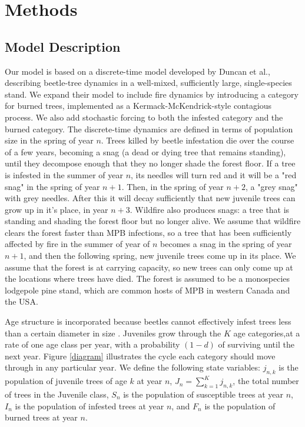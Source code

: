 \section{Methods}

\subsection{Model Description}

Our model is based on a discrete-time model developed by Duncan et al.\cite{duncan2015model}, describing beetle-tree dynamics in a well-mixed, sufficiently large, single-species stand. We expand their model to include fire dynamics by introducing a category for burned trees, implemented as a Kermack-McKendrick-style contagious process\cite{edelstein1988mathematical}. We also add stochastic forcing to both the infested category and the burned category. The discrete-time dynamics are defined in terms of population size in the spring of year $n$. Trees killed by beetle infestation die over the course of a few years, becoming a snag (a dead or dying tree that remains standing), until they decompose enough that they no longer shade the forest floor. If a tree is infested in the summer of year $n$, its needles will turn red and it will be a "red snag" in the spring of year $n+1$. Then, in the spring of year $n+2$, a "grey snag" with grey needles. After this it will decay sufficiently that new juvenile trees can grow up in it's place, in year $n+3$. Wildfire also produces snags: a tree that is standing and shading the forest floor but no longer alive. We assume that wildfire clears the forest faster than MPB infections, so a tree that has been sufficiently affected by fire in the summer of year of $n$ becomes a snag in the spring of year $n+1$, and then the following spring, new juvenile trees come up in its place. We assume that the forest is at carrying capacity, so new trees can only come up at the locations where trees have died. The forest is assumed to be a monospecies lodgepole pine stand, which are common hosts of MPB in western Canada and the USA.


Age structure is incorporated because beetles cannot effectively infest trees less than a certain diameter in size \cite{safranyik2003mountain, alfaro2003dendroecological}. Juveniles grow through the $K$ age categories,at a rate of one age class per year, with a  probability $(1-d)$ of surviving until the next year. Figure \ref{diagram} illustrates the cycle each category should move through in any particular year.  We define the following state variables: $j_{n,k}$ is the population of juvenile trees of age $k$ at year $n$, $J_n = \sum_{k = 1}^{K} j_{n,k}$, the total number of trees in the Juvenile class, $S_n$ is the population of susceptible trees at year $n$, $I_n$ is the population of infested trees at year $n$, and $F_n$ is the population of burned trees at year $n$.

